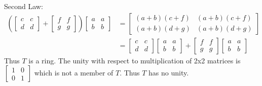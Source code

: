 \documentclass[paper=a4, fontsize=11pt]{jhwhw} %
\begin{document}
Second Law:
\begin{align}
\left(
\left[ \begin{array}{cc}
c & c \\
d & d \end{array} \right] +
\left[ \begin{array}{cc}
f & f \\
g & g \end{array} \right]\right)
\left[ \begin{array}{cc}
a & a \\
b & b \end{array} \right] &= 
\left[ \begin{array}{cc}
(a+b)(c+f) & (a+b)(c+f) \\
(a+b)(d+g) & (a+b)(d+g) \end{array} \right] \\
           &=
\left[ \begin{array}{cc}
c & c \\
d & d \end{array} \right]
\left[ \begin{array}{cc}
a & a \\
b & b \end{array} \right] + 
\left[ \begin{array}{cc}
f & f \\
g & g \end{array} \right] 
\left[ \begin{array}{cc}
a & a \\
b & b \end{array} \right]
\end{align}
Thus $T$ is a ring. The unity with respect to multiplication of 2x2 matrices is 
$
\left[ \begin{array}{cc}
1 & 0 \\
0 & 1 \end{array} \right]
$
 which is not a member of $T$. Thus $T$ has no unity.
\end{document}
